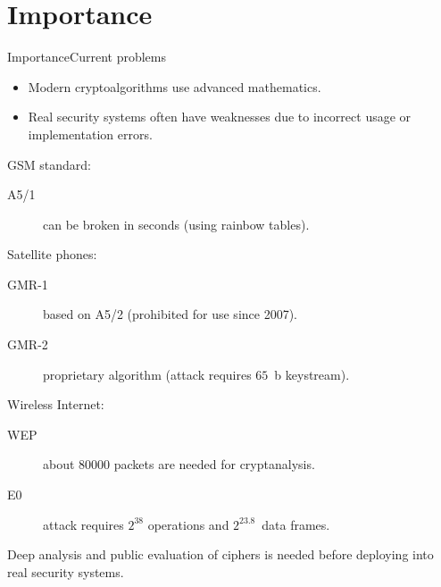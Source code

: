 \documentclass[10pt, ucs]{beamer}
\title[Symmetric ciphers cryptographic properties]{\worktitle}
\author[\workauthors]{
    \texorpdfstring{Ruslan Kiyanchuk\\[2ex]
    \scriptsize\url{ruslan.kiyanchuk@gmail.com}}{\workauthors} \\[4ex]%
    \begin{flushleft}
    \hspace*{10em}
    \normalsize Supervisor: \hspace*{10ex} Halimov G. Z. \\[0.8ex]
    \hspace*{7em}
    \normalsize Consultant: \hspace*{10ex} Oliynykov R. V.
    \end{flushleft} \\[-8ex]
}
\subtitle{Bachelor Thesis}
\institute[KNURE]{}
\date[Kharkiv 2012]{\normalsize Kharkiv 2012}
\begin{document}
\maketitle

\section{Importance}
\begin{frame}{Importance}{Current problems}
    \begin{block}{}
        \begin{itemize}
            \item Modern cryptoalgorithms use advanced mathematics.
            \item Real security systems often have weaknesses due to incorrect
                usage or implementation errors.
        \end{itemize}
    \end{block}
    \alert{GSM standard:}
    \begin{description}
        \item[A5/1] can be broken in seconds (using rainbow tables).
    \end{description}
    \alert{Satellite phones:}
    \begin{description}
        \item[GMR-1] based on A5/2 (prohibited for use since 2007).
        \item[GMR-2] proprietary algorithm (attack requires $65$~b keystream).
    \end{description}
    \alert{Wireless Internet:}
    \begin{description}
        \item [WEP] about $80000$ packets are needed for cryptanalysis.
        \item[E0] attack requires $2^{38}$ operations and $2^{23.8}$~data
            frames.
    \end{description}
    \begin{block}{}
        Deep analysis and public evaluation of ciphers is needed before deploying
        into real security systems.
    \end{block}
\end{frame}
\end{document}

